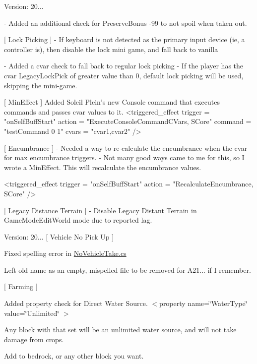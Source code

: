 Version\+: 20... \begin{DoxyVerb}
    - Added an additional check for PreserveBonus -99 to not spoil when taken out.

[ Lock Picking ]
    - If keyboard is not detected as the primary input device (ie, a controller is), then disable the lock mini game, and fall back to vanilla

    - Added a cvar check to fall back to regular lock picking
        - If the player has the cvar LegacyLockPick  of greater value than 0, default lock picking will be used, skipping the mini-game.

[ MinEffect ]
    Added Soleil Plein's new Console command that executes commands and passes cvar values to it.
        <triggered_effect trigger = "onSelfBuffStart" action = "ExecuteConsoleCommandCVars, SCore" command = "testCommand {0} {1}" cvars = "cvar1,cvar2" />

[ Encumbrance ]
    - Needed a way to re-calculate the encumbrance when the cvar for max encumbrance triggers.
    - Not many good ways came to me for this, so I wrote a MinEffect. This will recalculate the encumbrance values.

        <triggered_effect trigger = "onSelfBuffStart" action = "RecalculateEncumbrance, SCore"  />

[ Legacy Distance Terrain ]
    - Disable Legacy Distant Terrain in GameModeEditWorld mode due to reported lag.
\end{DoxyVerb}
 Version\+: 20... \mbox{[} Vehicle No Pick Up \mbox{]}
\begin{DoxyItemize}
\item Fixed spelling error in \mbox{\hyperlink{_no_vehicle_take_8cs_source}{No\+Vehicle\+Take.\+cs}}
\begin{DoxyItemize}
\item Left old name as an empty, mispelled file to be removed for A21... if I remember.
\end{DoxyItemize}
\end{DoxyItemize}

\mbox{[} Farming \mbox{]}
\begin{DoxyItemize}
\item Added property check for Direct Water Source. $<$property name=\char`\"{}\+Water\+Type\char`\"{} value=\char`\"{}\+Unlimited\char`\"{} $>$
\item Any block with that set will be an unlimited water source, and will not take damage from crops.
\item Add to bedrock, or any other block you want.
\end{DoxyItemize}

